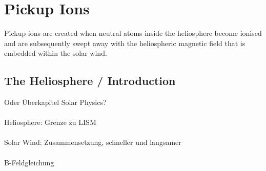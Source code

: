 
\chapter{Pickup Ions} %

\label{Chapter1} %





Pickup ions are created when neutral atoms inside the heliosphere become ionised and are subsequently swept away with the heliospheric magnetic field that is embedded within the solar wind.


\section{The Heliosphere / Introduction}

Oder Überkapitel Solar Physics?
\\ \\
Heliosphere: Grenze zu LISM
\\ \\
Solar Wind: Zusammensetzung, schneller und langsamer \\ \\
B-Feldgleichung


